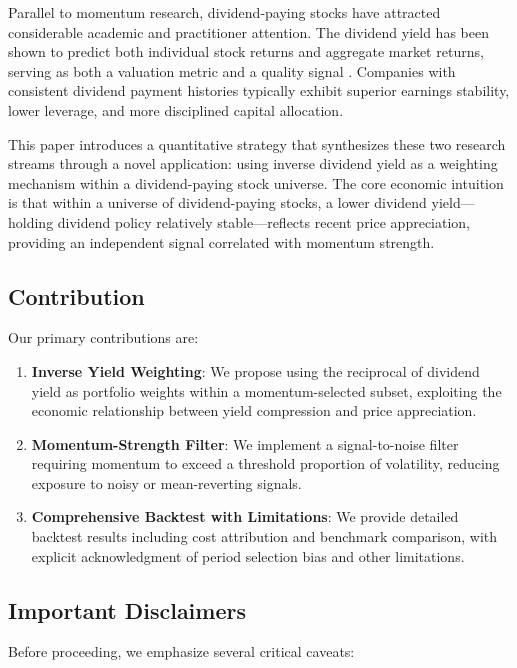 \documentclass[12pt,a4paper]{article}
\theoremstyle{definition}
\begin{document}
Parallel to momentum research, dividend-paying stocks have attracted considerable academic and practitioner attention. The dividend yield has been shown to predict both individual stock returns and aggregate market returns, serving as both a valuation metric and a quality signal \citep{fama1988dividend}. Companies with consistent dividend payment histories typically exhibit superior earnings stability, lower leverage, and more disciplined capital allocation.

This paper introduces a quantitative strategy that synthesizes these two research streams through a novel application: using inverse dividend yield as a weighting mechanism within a dividend-paying stock universe. The core economic intuition is that within a universe of dividend-paying stocks, a lower dividend yield---holding dividend policy relatively stable---reflects recent price appreciation, providing an independent signal correlated with momentum strength.

\subsection{Contribution}

Our primary contributions are:

\begin{enumerate}
    \item \textbf{Inverse Yield Weighting}: We propose using the reciprocal of dividend yield as portfolio weights within a momentum-selected subset, exploiting the economic relationship between yield compression and price appreciation.

    \item \textbf{Momentum-Strength Filter}: We implement a signal-to-noise filter requiring momentum to exceed a threshold proportion of volatility, reducing exposure to noisy or mean-reverting signals.

    \item \textbf{Comprehensive Backtest with Limitations}: We provide detailed backtest results including cost attribution and benchmark comparison, with explicit acknowledgment of period selection bias and other limitations.
\end{enumerate}

\subsection{Important Disclaimers}

Before proceeding, we emphasize several critical caveats:
\end{document}
